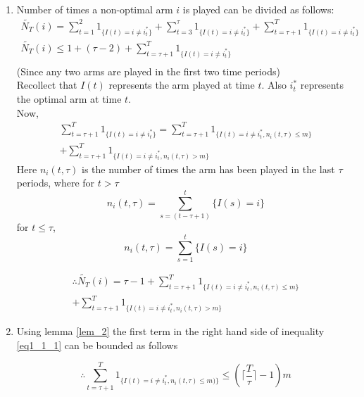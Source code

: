 \documentclass[compress, serif, onlymath, professionalfonts]{beamer}
\begin{document}
\begin{frame}[t,allowframebreaks]
\begin{enumerate}
\item Number of times a non-optimal arm $i$ is played can be divided as follows:
\begin{align*}
\tilde{N_T}(i)=\sum_{t=1}^{2}1_{\{I(t)=i\neq i^*_t\}}+\sum_{t=3}^{\tau}1_{\{I(t)=i\neq i^*_t\}}+\sum_{t=\tau+1}^{T}1_{\{I(t)=i\neq i^*_t\}}\\
\tilde{N_T}(i)\leq 1+(\tau-2)+\sum_{t=\tau+1}^{T}1_{\{I(t)=i\neq i^*_t\}}\\
\end{align*}
(Since any two arms are played in the first two time periods)\\
Recollect that $I(t)$ represents the arm played at time $t$. Also $i^*_t$ represents the optimal arm at time $t$.
\\Now,
\begin{multline*}
\sum_{t=\tau+1}^{T}1_{\{I(t)=i\neq i^*_t\}}=\sum_{t=\tau+1}^{T}1_{\{I(t)=i\neq i^*_t,n_i(t,\tau)\leq m\}}
\\+\sum_{t=\tau+1}^{T}1_{\{I(t)=i\neq i^*_t,n_i(t,\tau)> m\}}
\end{multline*}
Here $n_i(t,\tau)$ is the number of times the arm has been played in the last $\tau$ periods, where for $t>\tau$
$$n_i(t,\tau) = \sum_{s=(t-\tau+1)}^{t}\{I(s)=i\}$$
for $t\leq \tau $,
$$n_i(t,\tau) = \sum_{s=1}^{t}\{I(s)=i\}$$

\begin{multline}
\label{eq1_1_1}
\therefore \tilde{N_T}(i)=\tau-1+\sum_{t=\tau+1}^{T}1_{\{I(t)=i\neq i^*_t, n_i(t,\tau)\leq m\}}
\\+\sum_{t=\tau+1}^{T}1_{\{I(t)=i\neq i^*_t, n_i(t,\tau)> m\}}
\end{multline}
\item Using  lemma \ref{lem_2} the first term in the right hand side of inequality \ref{eq1_1_1} can be bounded as follows

\begin{equation}\label{eq3_1_1}
\therefore \sum_{t=\tau+1}^{T}1_{\{I(t)=i\neq i^*_t, n_i(t,\tau)\leq  m)\}} \leq ( \lceil{\frac{T}{\tau}}\rceil-1)m
\end{equation}



\end{enumerate}
\end{frame}
\end{document}
